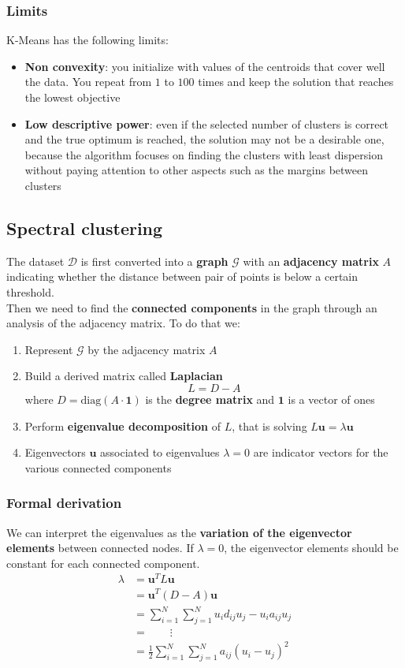 \subsubsection{Limits}
K-Means has the following limits:
\begin{itemize}
	\item \textbf{Non convexity}: you initialize with values of the centroids that cover well the data. You repeat from $1$ to $100$ times and keep the solution that reaches the lowest objective
	\item \textbf{Low descriptive power}: even if the selected number of clusters is correct and the true optimum is reached, the solution may not be a desirable one, because the algorithm focuses on finding the clusters with least dispersion without paying attention to other aspects such as the margins between clusters
\end{itemize}

\subsection{Spectral clustering}
The dataset $\mathcal{D}$ is first converted into a \textbf{graph} $\mathcal{G}$ with an \textbf{adjacency matrix} $A$ indicating whether the distance between pair of points is below a certain threshold.\\
Then we need to find the \textbf{connected components} in the graph through an analysis of the adjacency matrix. To do that we:
\begin{enumerate}
	\item Represent $\mathcal{G}$ by the adjacency matrix $A$
	\item Build a derived matrix called \textbf{Laplacian}
	\begin{equation*}
		L = D-A
	\end{equation*}
	where $D=\text{diag}(A \cdot \mathbf{1})$ is the \textbf{degree matrix} and $\mathbf{1}$ is a vector of ones
	\item Perform \textbf{eigenvalue decomposition} of $L$, that is solving $L\mathbf{u} = \lambda \mathbf{u}$
	\item Eigenvectors $\mathbf{u}$ associated to eigenvalues $\lambda = 0$ are indicator vectors for the various connected components 
\end{enumerate}
\subsubsection{Formal derivation}
We can interpret the eigenvalues as the \textbf{variation of the eigenvector elements} between connected nodes. If $\lambda=0$, the eigenvector elements should be constant for each connected component.
\begin{align*}
	\lambda & = \mathbf{u}^TL\mathbf{u}\\
	& = \mathbf{u}^T(D-A)\mathbf{u}\\
	& = \sum_{i=1}^{N} \sum_{j=1}^{N} u_id_{ij}u_j - u_ia_{ij}u_j\\
	& = \qquad \vdots \\
	& = \frac{1}{2} \sum_{i=1}^{N} \sum_{j=1}^{N} a_{ij} (u_i - u_j)^2
\end{align*}

